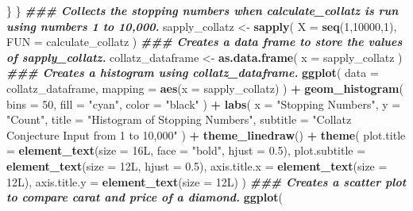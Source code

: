 \documentclass[
]{article}
\newenvironment{Shaded}{\begin{snugshade}}{\end{snugshade}}
\newcommand{\AttributeTok}[1]{\textcolor[rgb]{0.13,0.29,0.53}{#1}}
\newcommand{\DecValTok}[1]{\textcolor[rgb]{0.00,0.00,0.81}{#1}}
\newcommand{\DocumentationTok}[1]{\textcolor[rgb]{0.56,0.35,0.01}{\textbf{\textit{#1}}}}
\newcommand{\FloatTok}[1]{\textcolor[rgb]{0.00,0.00,0.81}{#1}}
\newcommand{\FunctionTok}[1]{\textcolor[rgb]{0.13,0.29,0.53}{\textbf{#1}}}
\newcommand{\NormalTok}[1]{#1}
\newcommand{\OtherTok}[1]{\textcolor[rgb]{0.56,0.35,0.01}{#1}}
\newcommand{\SpecialCharTok}[1]{\textcolor[rgb]{0.81,0.36,0.00}{\textbf{#1}}}
\newcommand{\StringTok}[1]{\textcolor[rgb]{0.31,0.60,0.02}{#1}}
\begin{document}
\begin{Shaded}
\begin{Highlighting}[]
\NormalTok{  \}}
\NormalTok{\}}
\DocumentationTok{\#\#\# Collects the stopping numbers when calculate\_collatz is run using numbers 1 to 10,000.}
\NormalTok{sapply\_collatz }\OtherTok{\textless{}{-}} \FunctionTok{sapply}\NormalTok{(}
  \AttributeTok{X =} \FunctionTok{seq}\NormalTok{(}\DecValTok{1}\NormalTok{,}\DecValTok{10000}\NormalTok{,}\DecValTok{1}\NormalTok{),}
  \AttributeTok{FUN =}\NormalTok{ calculate\_collatz}
\NormalTok{)}
\DocumentationTok{\#\#\# Creates a data frame to store the values of sapply\_collatz.}
\NormalTok{collatz\_dataframe }\OtherTok{\textless{}{-}} \FunctionTok{as.data.frame}\NormalTok{(}
  \AttributeTok{x =}\NormalTok{ sapply\_collatz}
\NormalTok{)}
\DocumentationTok{\#\#\# Creates a histogram using collatz\_dataframe.}
\FunctionTok{ggplot}\NormalTok{(}
  \AttributeTok{data =}\NormalTok{ collatz\_dataframe,}
  \AttributeTok{mapping =} \FunctionTok{aes}\NormalTok{(}\AttributeTok{x =} \StringTok{\textasciigrave{}}\AttributeTok{sapply\_collatz}\StringTok{\textasciigrave{}}\NormalTok{)}
\NormalTok{) }\SpecialCharTok{+}
  \FunctionTok{geom\_histogram}\NormalTok{(}
    \AttributeTok{bins =} \DecValTok{50}\NormalTok{,}
    \AttributeTok{fill =} \StringTok{"cyan"}\NormalTok{,}
    \AttributeTok{color =} \StringTok{"black"}
\NormalTok{  ) }\SpecialCharTok{+}
  \FunctionTok{labs}\NormalTok{(}
    \AttributeTok{x =} \StringTok{"Stopping Numbers"}\NormalTok{,}
    \AttributeTok{y =} \StringTok{"Count"}\NormalTok{,}
    \AttributeTok{title =} \StringTok{"Histogram of Stopping Numbers"}\NormalTok{,}
    \AttributeTok{subtitle =} \StringTok{"Collatz Conjecture Input from 1 to 10,000"}
\NormalTok{  ) }\SpecialCharTok{+}
  \FunctionTok{theme\_linedraw}\NormalTok{() }\SpecialCharTok{+}
  \FunctionTok{theme}\NormalTok{(}
    \AttributeTok{plot.title =} \FunctionTok{element\_text}\NormalTok{(}\AttributeTok{size =}\NormalTok{ 16L,}
                              \AttributeTok{face =} \StringTok{"bold"}\NormalTok{,}
                              \AttributeTok{hjust =} \FloatTok{0.5}\NormalTok{),}
    \AttributeTok{plot.subtitle =} \FunctionTok{element\_text}\NormalTok{(}\AttributeTok{size =}\NormalTok{ 12L,}
                                 \AttributeTok{hjust =} \FloatTok{0.5}\NormalTok{),}
    \AttributeTok{axis.title.x =} \FunctionTok{element\_text}\NormalTok{(}\AttributeTok{size =}\NormalTok{ 12L),}
    \AttributeTok{axis.title.y =} \FunctionTok{element\_text}\NormalTok{(}\AttributeTok{size =}\NormalTok{ 12L)}
\NormalTok{  )}
\DocumentationTok{\#\#\# Creates a scatter plot to compare carat and price of a diamond.}
\FunctionTok{ggplot}\NormalTok{(}

\end{Highlighting}
\end{Shaded}
\end{document}

